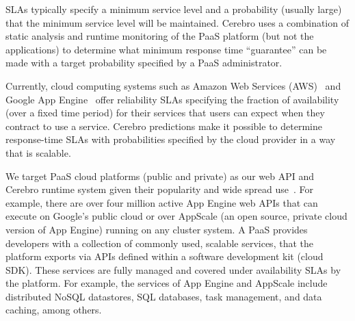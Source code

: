 SLAs typically specify a minimum service level and a
probability (usually large) that the minimum service level will be
maintained.  Cerebro uses a combination of static analysis and runtime
monitoring of the PaaS platform (but not the applications) to determine what
minimum response time ``guarantee'' can be made with a target probability
specified by a PaaS administrator.  

Currently, cloud computing systems such as Amazon Web Services
(AWS)~\cite{amazon-aws-web} and
Google App Engine~\cite{gae} offer reliability SLAs specifying the fraction of
availability (over a fixed time period) for their services
that users can expect when they contract to use a service.
Cerebro predictions make it possible to determine response-time SLAs with
probabilities specified by the cloud provider in a way
that is scalable.


We target PaaS cloud platforms (public and private) as our web API and Cerebro 
runtime system given their popularity and wide spread use~\cite{paas-growth}.
For example, there are over four million active App Engine web APIs that 
can execute on Google's public cloud or over AppScale (an open source, private 
cloud version of App Engine) running on any cluster system.
A PaaS provides developers 
with a collection of commonly used, scalable services,
that the platform exports via APIs defined within a software 
development kit (cloud SDK).  These services are fully managed and covered under 
availability SLAs by the platform. For example, the services 
of App Engine and AppScale 
include distributed NoSQL datastores, SQL databases, task management, 
and data caching, among others. 

